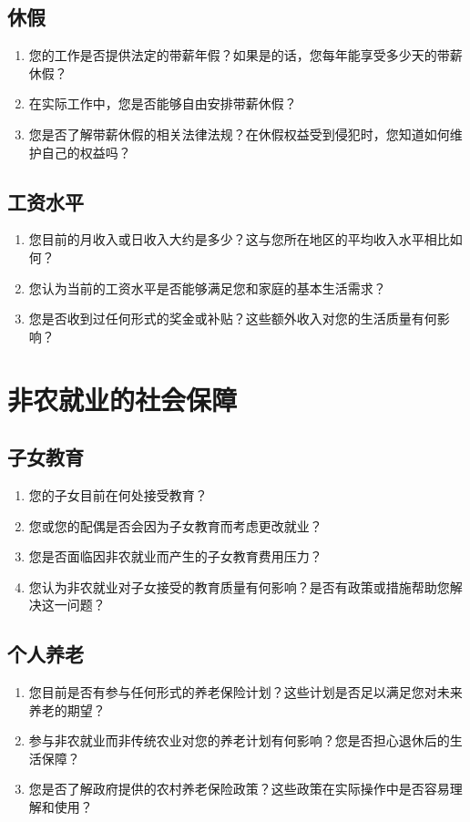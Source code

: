 \documentclass[12pt]{article}
\begin{document}
\subsection*{休假}
\begin{enumerate}
    \item 您的工作是否提供法定的带薪年假？如果是的话，您每年能享受多少天的带薪休假？
    \item 在实际工作中，您是否能够自由安排带薪休假？
    \item 您是否了解带薪休假的相关法律法规？在休假权益受到侵犯时，您知道如何维护自己的权益吗？
\end{enumerate}

\subsection*{工资水平}
\begin{enumerate}
    \item 您目前的月收入或日收入大约是多少？这与您所在地区的平均收入水平相比如何？
    \item 您认为当前的工资水平是否能够满足您和家庭的基本生活需求？
    \item 您是否收到过任何形式的奖金或补贴？这些额外收入对您的生活质量有何影响？
\end{enumerate}

\section{非农就业的社会保障}



\subsection*{子女教育}
\begin{enumerate}
    \item 您的子女目前在何处接受教育？
    \item 您或您的配偶是否会因为子女教育而考虑更改就业？
    \item 您是否面临因非农就业而产生的子女教育费用压力？
    \item 您认为非农就业对子女接受的教育质量有何影响？是否有政策或措施帮助您解决这一问题？
\end{enumerate}

\subsection*{个人养老}
\begin{enumerate}
    \item 您目前是否有参与任何形式的养老保险计划？这些计划是否足以满足您对未来养老的期望？
    \item 参与非农就业而非传统农业对您的养老计划有何影响？您是否担心退休后的生活保障？
    \item 您是否了解政府提供的农村养老保险政策？这些政策在实际操作中是否容易理解和使用？
\end{enumerate}
\end{document}
